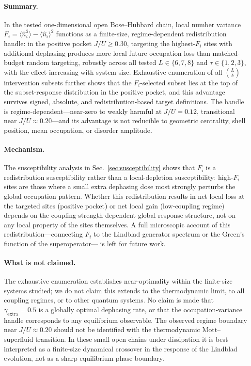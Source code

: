\documentclass[aps,pra,reprint,amsmath,amssymb,longbibliography,floatfix]{revtex4-2}
\newcommand{\Fi}{F_i}
\newcommand{\nop}{\hat{n}}
\begin{document}
\paragraph*{Summary.}
In the tested one-dimensional open Bose--Hubbard chain, local number
variance $\Fi = \langle\nop_i^2\rangle - \langle\nop_i\rangle^2$
functions as a finite-size, regime-dependent redistribution handle:
in the positive pocket $J/U\geq0.30$, targeting the highest-$\Fi$ sites
with additional dephasing produces more local future occupation loss than
matched-budget random targeting, robustly across all tested $L\in\{6,7,8\}$
and $\tau\in\{1,2,3\}$, with the effect increasing with system size.
Exhaustive enumeration of all $\binom{L}{k}$ intervention subsets
further shows that the $\Fi$-selected subset lies at the top of the
subset-response distribution in the positive pocket, and this advantage
survives signed, absolute, and redistribution-based target definitions.
The handle is regime-dependent---near-zero to weakly harmful at $J/U=0.12$,
transitional near $J/U\approx0.20$---and its advantage is not reducible to
geometric centrality, shell position, mean occupation, or disorder amplitude.

\paragraph*{Mechanism.}
The susceptibility analysis in Sec.~\ref{sec:susceptibility} shows that
$\Fi$ is a redistribution susceptibility rather than a local-depletion
susceptibility: high-$\Fi$ sites are those where a small extra dephasing
dose most strongly perturbs the global occupation pattern.
Whether this redistribution results in net local loss at the targeted sites
(positive pocket) or net local gain (low-coupling regime) depends on the
coupling-strength-dependent global response structure, not on any local
property of the sites themselves.
A full microscopic account of this redistribution---connecting $\Fi$ to the
Lindblad generator spectrum or the Green's function of the superoperator---
is left for future work.

\paragraph*{What is not claimed.}
The exhaustive enumeration establishes near-optimality within the
finite-size systems studied; we do not claim this extends to the
thermodynamic limit, to all coupling regimes, or to other quantum systems.
No claim is made that $\gamma_{\mathrm{extra}}=0.5$ is a globally
optimal dephasing rate, or that the occupation-variance handle corresponds
to any equilibrium observable.
The observed regime boundary near $J/U\approx0.20$ should not be
identified with the thermodynamic Mott--superfluid transition.
In these small open chains under dissipation it is best interpreted as a
finite-size dynamical crossover in the response of the Lindblad evolution,
not as a sharp equilibrium phase boundary.
\end{document}
